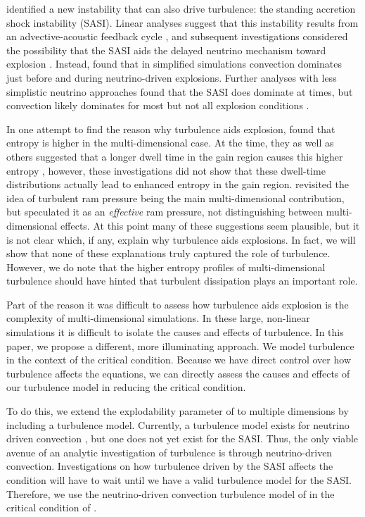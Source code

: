 \documentclass[twocolumn]{aastex6}
\begin{document}
\citet{blondin03} identified a new
instability that can also drive turbulence: the standing accretion
shock instability (SASI).  Linear analyses suggest
that this instability results from an advective-acoustic feedback
cycle \citep{fog00,fog06,sato09a,sato09b,guilet10}, and
subsequent investigations considered the possibility that the SASI
aids the delayed neutrino mechanism toward explosion \citep{marek09b,hanke12,hanke13,fernandez14}. Instead, \citet{murphy13} found that in simplified
simulations convection dominates just before and during neutrino-driven explosions. Further analyses with less
  simplistic neutrino approaches found that the SASI does dominate at times, but convection
likely dominates for most but not all explosion conditions 
\citep{muller16,radice16,burrows12,murphy13,murphy11}.
 
In one attempt to find the reason why turbulence aids explosion, \citet{murphy08b} found that entropy is higher in the
multi-dimensional case. At the time, they  as well as others suggested that a longer dwell time in the gain region causes this
higher entropy \citep{thompson05,marek09b,buras06}, however, these investigations did not show
  that these dwell-time distributions actually lead to enhanced
  entropy in the gain region. \citet{couch15}
revisited the idea of turbulent ram pressure being the main
multi-dimensional contribution, but speculated it as an
\textit{effective} ram pressure, not distinguishing between multi-dimensional effects. At this point many of these suggestions seem
  plausible, but it is not clear which, if any, explain why turbulence
aids explosions.  In fact, we will show that none of these
explanations truly captured the role of turbulence.  However, we do
note that the higher entropy profiles of multi-dimensional turbulence
should have hinted that turbulent dissipation plays an important role.

Part of the reason it was difficult to
assess how turbulence aids explosion is the complexity of
multi-dimensional simulations. In these large, non-linear simulations
it is difficult to isolate the causes and effects of turbulence. In
this paper, we propose a different, more illuminating approach.  We model turbulence in the context of the critical condition. Because we have direct control over how turbulence affects the equations, we can directly assess the causes and effects of our turbulence model in reducing the critical condition.

To do this, we extend the explodability parameter of \citet{murphy17} to multiple dimensions
  by including a turbulence model. Currently, a turbulence model exists for neutrino
  driven convection \citep{murphy11,murphy13}, but one does not yet exist for the SASI. Thus, the only viable avenue of an analytic investigation of turbulence is through neutrino-driven
convection. Investigations on how turbulence driven by the
  SASI affects the condition will have to wait until we have a valid
  turbulence model for the SASI. Therefore, we use the neutrino-driven convection turbulence model of \citet{murphy13} in the critical condition of \citet{murphy17}. 
\end{document}
